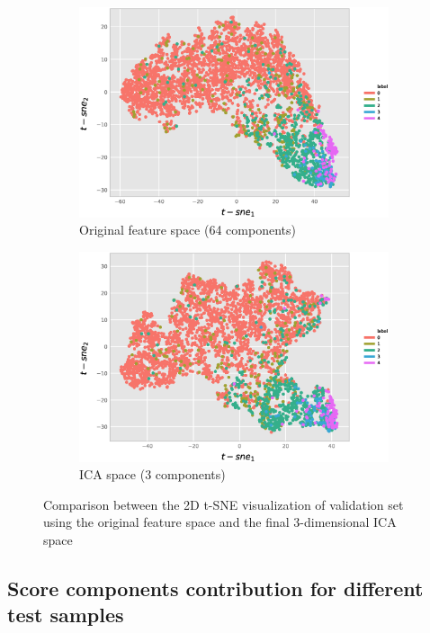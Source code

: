 \documentclass[review]{elsarticle}
\theoremstyle{definition} %
\theoremstyle{remark}
\begin{document}
\begin{figure}[h]
	\centering
	\begin{subfigure}[b]{0.49\textwidth}
		\centering
		\includegraphics[width=\textwidth]{./figures/tsne2d_p75.eps}
		\caption{Original feature space (64 components)}	
	\end{subfigure}
	\begin{subfigure}[b]{0.49\textwidth}
		\centering
		\includegraphics[width=\textwidth]{./figures/tsne2d_ica_p75.eps}
		\caption{ICA space (3 components)}
	\end{subfigure}
	
	\caption{Comparison between the 2D t-SNE visualization of validation set using the original feature space and the final 3-dimensional ICA space}  
	\label{fig:tsne} 
\end{figure}

\subsection{Score components contribution for different test samples}
\end{document}
